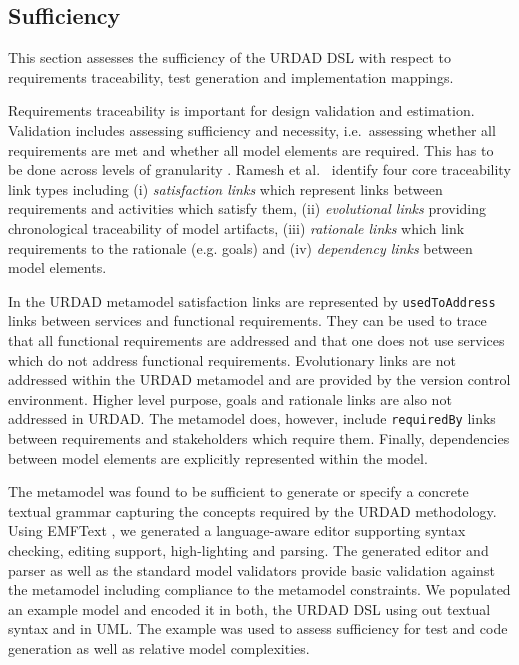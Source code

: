 
\subsection{Sufficiency}

This section assesses the sufficiency of the URDAD DSL with respect to requirements traceability, test generation and implementation mappings. 

Requirements traceability is important for design validation and estimation. Validation includes assessing sufficiency and necessity, i.e.\ assessing whether all requirements are met and whether all model elements are required. This has to be done across levels of granularity \cite{dick_design_2005}. Ramesh et al.\ \cite{ramesh_toward_2001} identify four core traceability link types including (i) \emph{satisfaction links} which represent links between requirements and activities which satisfy them, (ii) \emph{evolutional links} providing chronological traceability of model artifacts, (iii) \emph{rationale links} which link requirements to the rationale (e.g. goals) and (iv) \emph{dependency links} between model elements.

In the URDAD metamodel satisfaction links are represented by \verb+usedToAddress+ links between services and functional requirements. They can be used to trace that all functional requirements are addressed and that one does not use services which do not address functional requirements. Evolutionary links are not addressed within the URDAD metamodel and are provided by the version control environment. Higher level purpose, goals and rationale links are also not addressed in URDAD. The metamodel does, however, include  \verb+requiredBy+ links between requirements and stakeholders which require them. Finally, dependencies between model elements are explicitly represented within the model. 

The metamodel was found to be sufficient to generate or specify a concrete textual grammar capturing the concepts required by the URDAD methodology. Using EMFText \cite{heidenreich_derivation_2009}, we generated a language-aware editor supporting syntax checking, editing support, high-lighting and parsing. The generated editor and parser as well as the standard model validators provide basic validation against the metamodel including compliance to the metamodel constraints. We populated an example model and encoded it in both, the URDAD DSL using out textual syntax and in UML. The example was used to assess sufficiency for test and code generation as well as relative model complexities.

